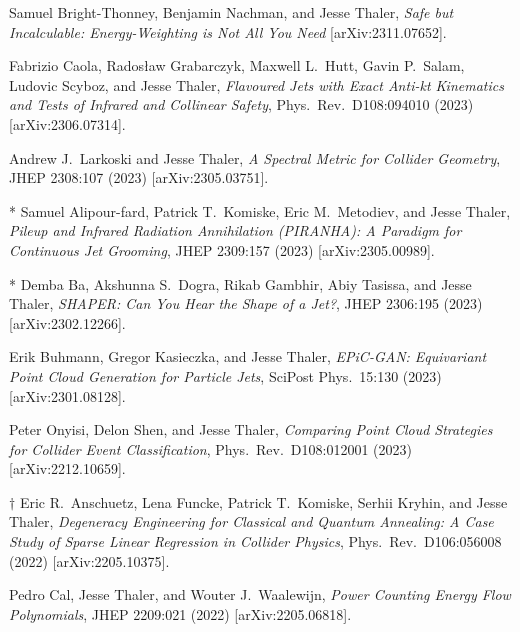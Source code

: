 \setcounter{jessecount}{126}

\begin{list}{[]\addtocounter{jessecount}{-1}}{\leftmargin=3em \itemsep=4pt}

\item
 Samuel Bright-Thonney, Benjamin Nachman, and Jesse Thaler,
\emph{Safe but Incalculable: Energy-Weighting is Not All You Need}
[arXiv:2311.07652].

\item
 Fabrizio Caola, Radosław Grabarczyk, Maxwell L.\ Hutt, Gavin P.\ Salam, Ludovic Scyboz, and Jesse Thaler,
\emph{Flavoured Jets with Exact Anti-kt Kinematics and Tests of Infrared and Collinear Safety},
Phys.\ Rev.\ D108:094010 (2023)
[arXiv:2306.07314].

\item
 Andrew J.\ Larkoski and Jesse Thaler,
\emph{A Spectral Metric for Collider Geometry},
JHEP 2308:107 (2023)
[arXiv:2305.03751].

\item
* Samuel Alipour-fard, Patrick T.\ Komiske, Eric M.\ Metodiev, and Jesse Thaler,
\emph{Pileup and Infrared Radiation Annihilation (PIRANHA): A Paradigm for Continuous Jet Grooming},
JHEP 2309:157 (2023)
[arXiv:2305.00989].

\item
* Demba Ba, Akshunna S.\ Dogra, Rikab Gambhir, Abiy Tasissa, and Jesse Thaler,
\emph{SHAPER: Can You Hear the Shape of a Jet?},
JHEP 2306:195 (2023)
[arXiv:2302.12266].

\item
 Erik Buhmann, Gregor Kasieczka, and Jesse Thaler,
\emph{EPiC-GAN: Equivariant Point Cloud Generation for Particle Jets},
SciPost Phys.\ 15:130 (2023)
[arXiv:2301.08128].

\item
 Peter Onyisi, Delon Shen, and Jesse Thaler,
\emph{Comparing Point Cloud Strategies for Collider Event Classification},
Phys.\ Rev.\ D108:012001 (2023)
[arXiv:2212.10659].

\item
$\dagger$ Eric R.\ Anschuetz, Lena Funcke, Patrick T.\ Komiske, Serhii Kryhin, and Jesse Thaler,
\emph{Degeneracy Engineering for Classical and Quantum Annealing: A Case Study of Sparse Linear Regression in Collider Physics},
Phys.\ Rev.\ D106:056008 (2022)
[arXiv:2205.10375].

\item
 Pedro Cal, Jesse Thaler, and Wouter J.\ Waalewijn,
\emph{Power Counting Energy Flow Polynomials},
JHEP 2209:021 (2022)
[arXiv:2205.06818].


\end{list}
